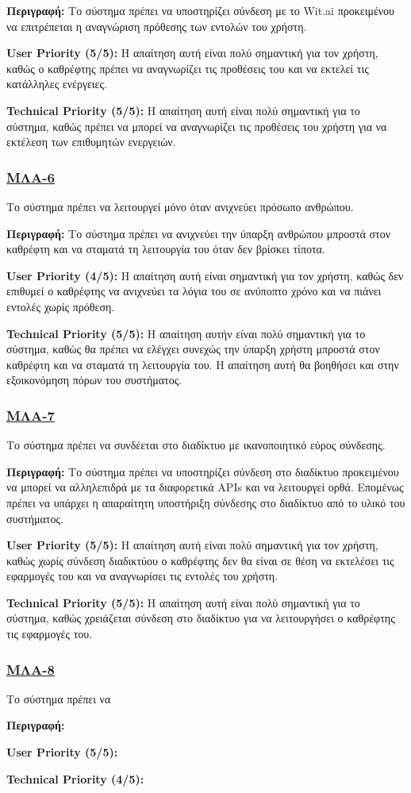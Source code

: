 \noindent\textbf{Περιγραφή:} Το σύστημα πρέπει να υποστηρίζει σύνδεση με το Wit.ai προκειμένου να επιτρέπεται η αναγνώριση πρόθεσης των εντολών του χρήστη.

\noindent\textbf{User Priority (5/5):} Η απαίτηση αυτή είναι πολύ σημαντική για τον χρήστη, καθώς ο καθρέφτης πρέπει να αναγνωρίζει τις προθέσεις του και να εκτελεί τις κατάλληλες ενέργειες.

\noindent\textbf{Technical Priority (5/5):} Η απαίτηση αυτή είναι πολύ σημαντική για το σύστημα, καθώς πρέπει να μπορεί να αναγνωρίζει τις προθέσεις του χρήστη για να εκτέλεση των επιθυμητών ενεργειών.

\subsubsection{\underline{ΜΛΑ-6}}
\noindent Το σύστημα πρέπει να λειτουργεί μόνο όταν ανιχνεύει πρόσωπο ανθρώπου.

\noindent\textbf{Περιγραφή:} Το σύστημα πρέπει να ανιχνεύει την ύπαρξη ανθρώπου μπροστά στον καθρέφτη και να σταματά τη λειτουργία του όταν δεν βρίσκει τίποτα.

\noindent\textbf{User Priority (4/5):} Η απαίτηση αυτή είναι σημαντική για τον χρήστη, καθώς δεν επιθυμεί ο καθρέφτης να ανιχνεύει τα λόγια του σε ανύποπτο χρόνο και να πιάνει εντολές χωρίς πρόθεση.

\noindent\textbf{Technical Priority (5/5):} Η απαίτηση αυτήν είναι πολύ σημαντική για το σύστημα, καθώς θα πρέπει να ελέγχει συνεχώς την ύπαρξη χρήστη μπροστά στον καθρέφτη και να σταματά τη λειτουργία του. Η απαίτηση αυτή θα βοηθήσει και στην εξοικονόμηση πόρων του συστήματος.

\subsubsection{\underline{ΜΛΑ-7}}
\noindent Το σύστημα πρέπει να συνδέεται στο διαδίκτυο με ικανοποιητικό εύρος σύνδεσης.

\noindent\textbf{Περιγραφή:} Το σύστημα πρέπει να υποστηρίζει σύνδεση στο διαδίκτυο προκειμένου να μπορεί να αλληλεπιδρά με τα διαφορετικά APIs και να λειτουργεί ορθά. Επομένως πρέπει να υπάρχει η απαραίτητη υποστήριξη σύνδεσης στο διαδίκτυο από το υλικό του συστήματος.

\noindent\textbf{User Priority (5/5):} Η απαίτηση αυτή είναι πολύ σημαντική για τον χρήστη, καθώς χωρίς σύνδεση διαδικτύου ο καθρέφτης δεν θα είναι σε θέση να εκτελέσει τις εφαρμογές του και να αναγνωρίσει τις εντολές του χρήστη.

\noindent\textbf{Technical Priority (5/5):} Η απαίτηση αυτή είναι πολύ σημαντική για το σύστημα, καθώς χρειάζεται σύνδεση στο διαδίκτυο για να λειτουργήσει ο καθρέφτης τις εφαρμογές του. 

\subsubsection{\underline{ΜΛΑ-8}}
\noindent Το σύστημα πρέπει να 

\noindent\textbf{Περιγραφή:}

\noindent\textbf{User Priority (5/5):}

\noindent\textbf{Technical Priority (4/5):}